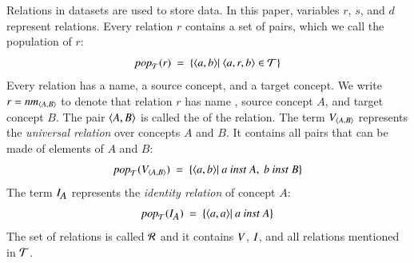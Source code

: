 \documentclass{elsarticle}
\begin{document}
   Relations in datasets are used to store data.
   In this paper, variables $r$, $s$, and $d$ represent relations.
   Every relation $r$ contains a set of pairs, which we call the population of $r$:
\begin{equation}
   \pop{\triples}{r}\ =\ \{ \pair{a}{b}|\ \triple{a}{r}{b}\in\triples\}
\end{equation}
   Every relation has a name, a source concept, and a target concept.
   We write $r=\text{\it nm\/}_{\langle{A},{B}\rangle}$ to denote that relation $r$ has name , source concept $A$, and target concept $B$.
   The pair $\langle{A},{B}\rangle$ is called the  of the relation.
   The term $V_{\langle{A},{B}\rangle}$ represents the \emph{universal relation} over concepts $A$ and $B$.
   It contains all pairs that can be made of elements of $A$ and $B$:
\[\text{\it pop\/}_{\mathcal{T}}(V_{\langle{A},{B}\rangle})\ =\ \{ \langle{a},{b}\rangle|\ a\ \text{\it inst\/}\ A,\ b\ \text{\it inst\/}\ B \}\]
   The term $I_{\text{\it \small A\/}}$ represents the \emph{identity relation} of concept $A$:
\[\text{\it pop\/}_{\mathcal{T}}(I_{\text{\it \small A\/}})\ =\ \{ \langle{a},{a}\rangle|\ a\ \text{\it inst\/}\ A \}\]
   The set of relations is called $\mathcal{R}$ and it contains $V$, $I$, and all relations mentioned in $\mathcal{T}$.
\end{document}
